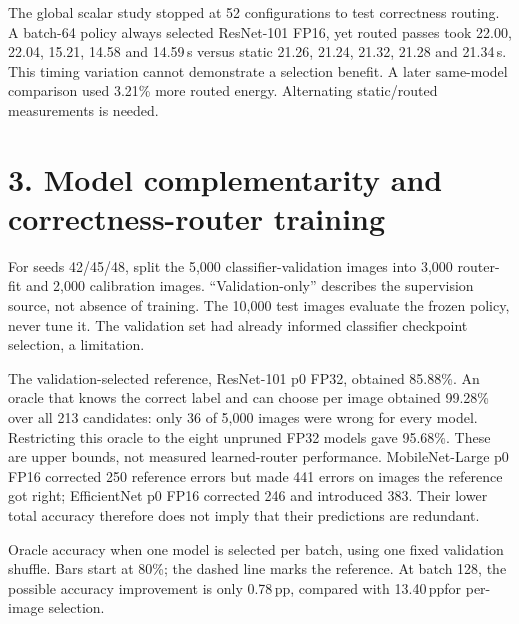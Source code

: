\documentclass[10pt,a4paper]{article}
\newcommand{\pp}{\,pp}
\newcommand{\pagehead}[1]{\section*{#1}}
\begin{document}
The global scalar study stopped at 52 configurations to test correctness routing. A batch-64 policy always selected ResNet-101 FP16, yet routed passes took 22.00, 22.04, 15.21, 14.58 and 14.59\,s versus static 21.26, 21.24, 21.32, 21.28 and 21.34\,s. This timing variation cannot demonstrate a selection benefit. A later same-model comparison used 3.21\% more routed energy. Alternating static/routed measurements is needed.

\newpage
\pagehead{3. Model complementarity and correctness-router training}
For seeds 42/45/48, split the 5,000 classifier-validation images into 3,000 router-fit and 2,000 calibration images. ``Validation-only'' describes the supervision source, not absence of training. The 10,000 test images evaluate the frozen policy, never tune it. The validation set had already informed classifier checkpoint selection, a limitation.

The validation-selected reference, ResNet-101 p0 FP32, obtained 85.88\%. An oracle that knows the correct label and can choose per image obtained 99.28\% over all 213 candidates: only 36 of 5,000 images were wrong for every model. Restricting this oracle to the eight unpruned FP32 models gave 95.68\%. These are upper bounds, not measured learned-router performance. MobileNet-Large p0 FP16 corrected 250 reference errors but made 441 errors on images the reference got right; EfficientNet p0 FP16 corrected 246 and introduced 383. Their lower total accuracy therefore does not imply that their predictions are redundant.

\begin{center}
\end{center}
{\small Oracle accuracy when one model is selected per batch, using one fixed validation shuffle. Bars start at 80\%; the dashed line marks the reference. At batch 128, the possible accuracy improvement is only 0.78\pp, compared with 13.40\pp for per-image selection.}
\end{document}
